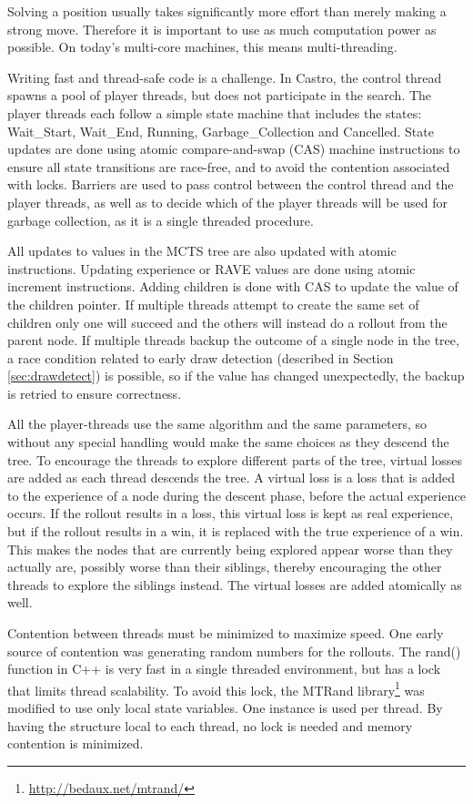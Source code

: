 Solving a position usually takes significantly more effort than merely making a strong move. Therefore it is important to use as much computation power as possible. On today's multi-core machines, this means multi-threading.

Writing fast and thread-safe code is a challenge. In Castro, the control thread spawns a pool of player threads, but does not participate in the search. The player threads each follow a simple state machine that includes the states: Wait\_Start, Wait\_End, Running, Garbage\_Collection and Cancelled. State updates are done using atomic compare-and-swap (CAS) machine instructions to ensure all state transitions are race-free, and to avoid the contention associated with locks. Barriers are used to pass control between the control thread and the player threads, as well as to decide which of the player threads will be used for garbage collection, as it is a single threaded procedure.

All updates to values in the MCTS tree are also updated with atomic instructions. Updating experience or RAVE values are done using atomic increment instructions. Adding children is done with CAS to update the value of the children pointer. If multiple threads attempt to create the same set of children only one will succeed and the others will instead do a rollout from the parent node. If multiple threads backup the outcome of a single node in the tree, a race condition related to early draw detection (described in Section \ref{sec:drawdetect}) is possible, so if the value has changed unexpectedly, the backup is retried to ensure correctness.

All the player-threads use the same algorithm and the same parameters, so without any special handling would make the same choices as they descend the tree. To encourage the threads to explore different parts of the tree, virtual losses\cite{chaslot2008parallel} are added as each thread descends the tree. A virtual loss is a loss that is added to the experience of a node during the descent phase, before the actual experience occurs. If the rollout results in a loss, this virtual loss is kept as real experience, but if the rollout results in a win, it is replaced with the true experience of a win. This makes the nodes that are currently being explored appear worse than they actually are, possibly worse than their siblings, thereby encouraging the other threads to explore the siblings instead. The virtual losses are added atomically as well.

Contention between threads must be minimized to maximize speed. One early source of contention was generating random numbers for the rollouts. The rand() function in C++ is very fast in a single threaded environment, but has a lock that limits thread scalability. To avoid this lock, the MTRand library\footnote{\url{http://bedaux.net/mtrand/}} was modified to use only local state variables. One instance is used per thread. By having the structure local to each thread, no lock is needed and memory contention is minimized.

